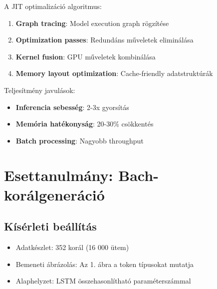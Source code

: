 A JIT optimalizáció algoritmus:
\begin{enumerate}
\item \textbf{Graph tracing}: Model execution graph rögzítése
\item \textbf{Optimization passes}: Redundáns műveletek eliminálása
\item \textbf{Kernel fusion}: GPU műveletek kombinálása
\item \textbf{Memory layout optimization}: Cache-friendly adatstruktúrák
\end{enumerate}

Teljesítmény javulások:
\begin{itemize}
\item \textbf{Inferencia sebesség}: 2-3x gyorsítás
\item \textbf{Memória hatékonyság}: 20-30\% csökkentés
\item \textbf{Batch processing}: Nagyobb throughput
\end{itemize}

\section{Esettanulmány: Bach-korálgeneráció}
\subsection{Kísérleti beállítás}
\begin{itemize}
    \item Adatkészlet: 352 korál (16 000 ütem)
    \item Bemeneti ábrázolás: Az 1. ábra a token típusokat mutatja
    \item Alaphelyzet: LSTM összehasonlítható paraméterszámmal
\end{itemize}

\centering
{}

